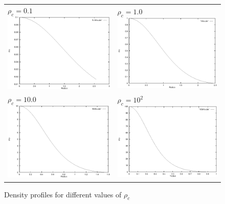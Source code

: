 \documentclass[a4paper]{IEEEtran}
\begin{document}
    \begin{figure} 
    \caption{Density profiles for different values of $\rho_c$} 
    \label{fig:density-profiles} 
    \begin{center}
    \begin{tabular}{p{7cm}p{7cm}}  
        $\rho_c = 0.1$ \newline \includegraphics[width=7cm]{figures/0-1rho.eps} & 
        $\rho_c = 1.0$ \newline \includegraphics[width=7cm]{figures/1rho.eps}  
        \\
        $\rho_c = 10.0$ \newline \includegraphics[width=7cm]{figures/10rho.eps}  & 
        $\rho_c = 10^2$ \newline \includegraphics[width=7cm]{figures/100rho.eps}    

\end{tabular}
\end{center}
\end{figure}
\end{document}

